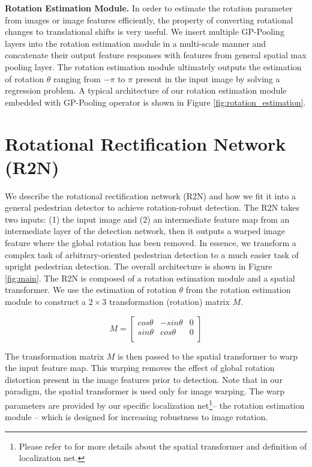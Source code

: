 \documentclass[10pt,twocolumn,letterpaper]{article}
\begin{document}
\noindent\textbf{Rotation Estimation Module.} In order to estimate the rotation parameter from images or image features efficiently, the property of converting rotational changes to translational shifts is very useful. We insert multiple GP-Pooling layers into the rotation estimation module in a multi-scale manner and concatenate their output feature responses with features from general spatial max pooling layer. The rotation estimation module ultimately outputs the estimation of rotation $\theta$ ranging from $-\pi$ to $\pi$ present in the input image by solving a regression problem. A typical architecture of our rotation estimation module embedded with GP-Pooling operator is shown in Figure \ref{fig:rotation_estimation}. 

\section{Rotational Rectification Network (R2N)}

We describe the rotational rectification network (R2N) and how we fit it into a general pedestrian detector to achieve rotation-robust detection. The R2N takes two inputs: (1) the input image and (2) an intermediate feature map from an intermediate layer of the detection network, then it outputs a warped image feature where the global rotation has been removed. In essence, we transform a complex task of arbitrary-oriented pedestrian detection to a much easier task of upright pedestrian detection. The overall architecture is shown in Figure \ref{fig:main}. The R2N is composed of a rotation estimation module and a spatial transformer. We use the estimation of rotation $\theta$ from the rotation estimation module to construct a $2 \times 3$ transformation (rotation) matrix $M$.

\vspace{-0.2cm}
\begin{equation} \label{eq:rot_matrix}
M = \begin{bmatrix}
    cos\theta   & -sin\theta & 0 \\
    sin\theta   & cos\theta & 0 \\
\end{bmatrix}
\end{equation}
\vspace{-0.2cm}

The transformation matrix $M$ is then passed to the spatial transformer to warp the input feature map. This warping removes the effect of global rotation distortion present in the image features prior to detection. Note that in our paradigm, the spatial transformer is used only for image warping. The warp parameters are provided by our specific localization net\footnote{Please refer to \cite{Jaderberg2015} for more details about the spatial transformer and definition of localization net.}-- the rotation estimation module -- which is designed for increasing robustness to image rotation. 
\end{document}
